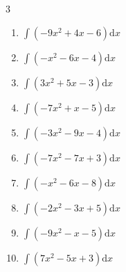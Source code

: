 \begin{multicols}{3}
\begin{enumerate}

\columnbreak %

  \item $\displaystyle \int \left( -9x^{2}+4x-6 \right) \mathrm{d}x$


  \item $\displaystyle \int \left( -x^{2}-6x-4 \right) \mathrm{d}x$


  \item $\displaystyle \int \left( 3x^{2}+5x-3 \right) \mathrm{d}x$


  \item $\displaystyle \int \left( -7x^{2}+x-5 \right) \mathrm{d}x$


  \item $\displaystyle \int \left( -3x^{2}-9x-4 \right) \mathrm{d}x$


  \item $\displaystyle \int \left( -7x^{2}-7x+3 \right) \mathrm{d}x$


  \item $\displaystyle \int \left( -x^{2}-6x-8 \right) \mathrm{d}x$


  \item $\displaystyle \int \left( -2x^{2}-3x+5 \right) \mathrm{d}x$


  \item $\displaystyle \int \left( -9x^{2}-x-5 \right) \mathrm{d}x$


  \item $\displaystyle \int \left( 7x^{2}-5x+3 \right) \mathrm{d}x$


\end{enumerate}
\end{multicols}
